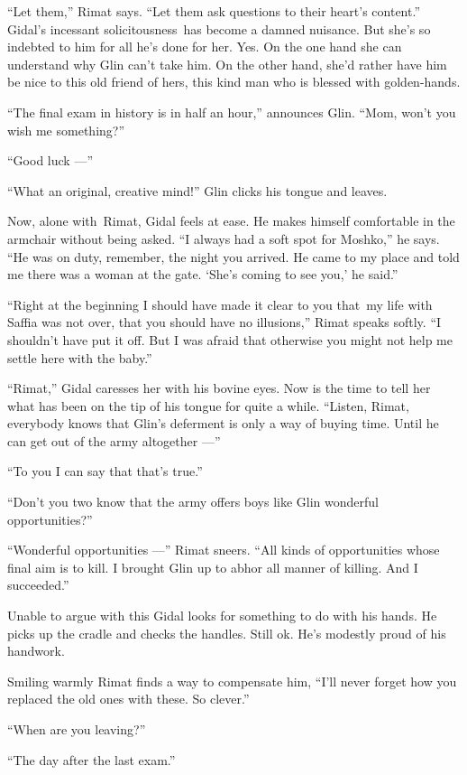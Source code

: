 \documentclass[twoside,11pt]{book}
\begin{document}
``Let them,'' Rimat says. ``Let them ask questions to their heart's
content.'' Gidal's incessant solicitousness~has become a damned nuisance. But she's so indebted to him for
all he's done for her. Yes. On the one hand she can understand why Glin can't take him. On the other hand, she'd rather
have him be nice to this old friend of hers, this kind man who is blessed with golden-hands.

``The final exam in history is in half an hour,'' announces Glin. ``Mom, won't
you wish me something?''

``Good luck ---''

``What an original, creative mind!'' Glin clicks his tongue and leaves.

Now, alone with~Rimat, Gidal feels at ease. He makes himself comfortable in the armchair without being asked.
``I always had a soft spot for Moshko,'' he says. ``He was on duty, remember,
the night you arrived. He came to my place and told me there was a woman at the gate. `She's coming to see you,' he
said.''

``Right at the beginning I should have made it clear to you that~my life with Saffia was not over, that you
should have no illusions,'' Rimat speaks softly. ``I shouldn't have put it off. But I was afraid that otherwise you
might not help me settle here with the baby.''

``Rimat,'' Gidal caresses her with his bovine eyes. Now is the time to tell her what has been
on the tip of his tongue for quite{ }a while. ``Listen, Rimat, everybody knows that Glin's
deferment is only a way of buying time. Until he can get out of the army altogether ---''

``To you I can say that that's true.''

``Don't you two know that the army offers boys like Glin wonderful opportunities?''

``Wonderful opportunities ---'' Rimat sneers. ``All kinds of opportunities whose
final aim is to kill. I brought Glin up to abhor all manner of killing. And I succeeded.''

Unable to argue with this Gidal looks for something to do with his hands. He picks up the cradle and checks the handles.
Still ok. He's modestly proud of his handwork.

Smiling warmly Rimat finds a way to compensate him, ``I'll never forget how you replaced the old ones with
these. So clever.''

``When are you leaving?''

``The day after the last exam.''
\end{document}
